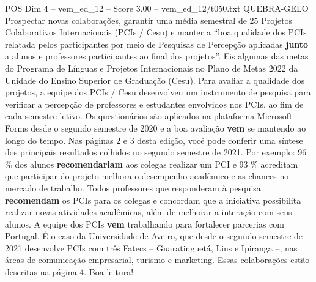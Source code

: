 \begin{textsample}{POS Dim 4 – vem\_ed\_12 – Score 3.00 – vem\_ed\_12/t050.txt}  \label{ex:f4_pos_141}
QUEBRA-GELO Prospectar novas colaborações, garantir uma média semestral de 25 Projetos Colaborativos Internacionais (PCIs / Cesu) e manter a “boa qualidade dos PCIs relatada pelos participantes por meio de Pesquisas de Percepção aplicadas \textbf{junto} a alunos e professores participantes ao final dos projetos”.
Eis algumas das metas do Programa de Línguas e Projetos Internacionais no Plano de Metas 2022 da Unidade do Ensino Superior de Graduação (Cesu).
Para avaliar a qualidade dos projetos, a equipe dos PCIs / Cesu desenvolveu um instrumento de pesquisa para verificar a percepção de professores e estudantes envolvidos nos PCIs, ao fim de cada semestre letivo.
Os questionários são aplicados na plataforma Microsoft Forms desde o segundo semestre de 2020 e a boa avaliação \textbf{vem} se mantendo ao longo do tempo.
Nas páginas 2 e 3 desta edição, você pode conferir uma síntese dos principais resultados colhidos no segundo semestre de 2021.
Por exemplo: 96 \% dos alunos \textbf{recomendariam} aos colegas realizar um PCI e 93 \% acreditam que participar do projeto melhora o desempenho acadêmico e as chances no mercado de trabalho.
Todos professores que responderam à pesquisa \textbf{recomendam} os PCIs para os colegas e concordam que a iniciativa possibilita realizar novas atividades acadêmicas, além de melhorar a interação com seus alunos.
A equipe dos PCIs \textbf{vem} trabalhando para fortalecer parcerias com Portugal.
É o caso da Universidade de Aveiro, que desde o segundo semestre de 2021 desenvolve PCIs com três Fatecs – Guaratinguetá, Lins e Ipiranga –, nas áreas de comunicação empresarial, turismo e marketing.
Essas colaborações estão descritas na página 4.
Boa leitura!

\end{textsample}
